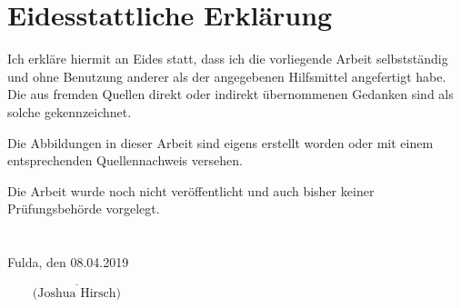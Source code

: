 \newpage
\chapter*{Eidesstattliche Erklärung}
\thispagestyle{empty}
Ich erkläre hiermit an Eides statt, dass ich die vorliegende Arbeit selbstständig und ohne Benutzung anderer als der angegebenen Hilfsmittel angefertigt habe.
Die aus fremden Quellen direkt oder indirekt übernommenen Gedanken sind als solche gekennzeichnet.

Die Abbildungen in dieser Arbeit sind eigens erstellt worden oder mit einem entsprechenden Quellennachweis versehen.

Die Arbeit wurde noch nicht veröffentlicht und auch bisher keiner Prüfungsbehörde vorgelegt.
\\\\\\
\noindent Fulda, den 08.04.2019
\begin{flushright}
$\overline{~~~~~~~~~\mbox{(Joshua Hirsch)}~~~~~~~~~}$
\end{flushright}